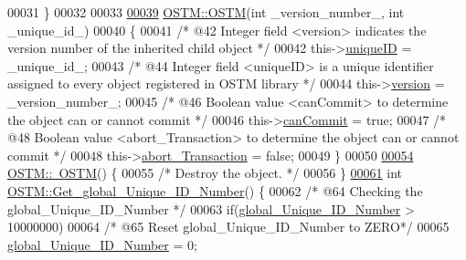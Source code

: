\begin{DoxyCode}
00031 \}
00032 
00033 
\hypertarget{_o_s_t_m_8cpp_source.tex_l00039}{}\hyperlink{class_o_s_t_m_a2314f55a127b94aa8a51d19ba798401e_a2314f55a127b94aa8a51d19ba798401e}{00039} \hyperlink{class_o_s_t_m_a968edf778668bd0ec7603f0571619196_a968edf778668bd0ec7603f0571619196}{OSTM::OSTM}(\textcolor{keywordtype}{int} \_version\_number\_, \textcolor{keywordtype}{int} \_unique\_id\_)
00040 \{
00041     \textcolor{comment}{/* @42 Integer field <version> indicates the version number of the inherited child object */}
00042     this->\hyperlink{class_o_s_t_m_aa9fe59368b701af7f70befa23bd6901a_aa9fe59368b701af7f70befa23bd6901a}{uniqueID} = \_unique\_id\_;
00043     \textcolor{comment}{/* @44 Integer field <uniqueID> is a unique identifier assigned to every object registered in OSTM
       library */}
00044     this->\hyperlink{class_o_s_t_m_a9a6ea36181be2db7f9082d77956511d7_a9a6ea36181be2db7f9082d77956511d7}{version} = \_version\_number\_;
00045     \textcolor{comment}{/* @46 Boolean value <canCommit> to determine the object can or cannot commit */}
00046     this->\hyperlink{class_o_s_t_m_a2a5b89641af274ddc69bdf8c1c1a07d6_a2a5b89641af274ddc69bdf8c1c1a07d6}{canCommit} = \textcolor{keyword}{true};
00047     \textcolor{comment}{/* @48 Boolean value <abort\_Transaction> to determine the object can or cannot commit */}
00048     this->\hyperlink{class_o_s_t_m_a5121d9c4b08320b26beca82ba2f85c4a_a5121d9c4b08320b26beca82ba2f85c4a}{abort\_Transaction} = \textcolor{keyword}{false};
00049 \}
00050 
\hypertarget{_o_s_t_m_8cpp_source.tex_l00054}{}\hyperlink{class_o_s_t_m_a30a17d73d0259c60eeab72d6dfa9ceb1_a30a17d73d0259c60eeab72d6dfa9ceb1}{00054} \hyperlink{class_o_s_t_m_a30a17d73d0259c60eeab72d6dfa9ceb1_a30a17d73d0259c60eeab72d6dfa9ceb1}{OSTM::~OSTM}() \{
00055     \textcolor{comment}{/* Destroy the object. */}
00056 \}
\hypertarget{_o_s_t_m_8cpp_source.tex_l00061}{}\hyperlink{class_o_s_t_m_adee6903c1100e0d78640bd4b85e5d7df_adee6903c1100e0d78640bd4b85e5d7df}{00061} \textcolor{keywordtype}{int} \hyperlink{class_o_s_t_m_adee6903c1100e0d78640bd4b85e5d7df_adee6903c1100e0d78640bd4b85e5d7df}{OSTM::Get\_global\_Unique\_ID\_Number}() \{
00062     \textcolor{comment}{/* @64 Checking the global\_Unique\_ID\_Number */}
00063     \textcolor{keywordflow}{if}(\hyperlink{class_o_s_t_m_acb617b9666d198c0de333c8613df0d4b_acb617b9666d198c0de333c8613df0d4b}{global\_Unique\_ID\_Number} > 10000000)
00064         \textcolor{comment}{/* @65 Reset global\_Unique\_ID\_Number to ZERO*/}
00065         \hyperlink{class_o_s_t_m_acb617b9666d198c0de333c8613df0d4b_acb617b9666d198c0de333c8613df0d4b}{global\_Unique\_ID\_Number} = 0;

\end{DoxyCode}
